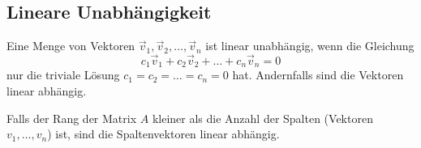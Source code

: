 \documentclass{article}
\begin{document}
\begin{minipage}[t]{0.45\textwidth}
    \subsection*{Lineare Unabhängigkeit}
    Eine Menge von Vektoren \( \vec{v}_1, \vec{v}_2, \ldots, \vec{v}_n \) ist linear unabhängig, wenn die Gleichung
    \begin{equation*}
        c_1 \vec{v}_1 + c_2 \vec{v}_2 + \ldots + c_n \vec{v}_n = 0
    \end{equation*}
    nur die triviale Lösung \( c_1 = c_2 = \ldots = c_n = 0 \) hat. Andernfalls sind die Vektoren linear abhängig.

    Falls der Rang der Matrix $A$ kleiner als die Anzahl der Spalten (Vektoren $v_1, \ldots, v_n$) ist, sind die Spaltenvektoren linear abhängig.
\end{minipage}

\pagebreak
\end{document}
